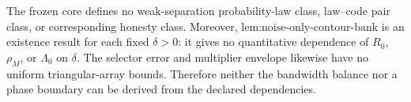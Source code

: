 The frozen core defines no weak-separation probability-law class, law--code pair class, or corresponding honesty class.  Moreover, \(\text{lem:noise-only-contour-bank}\) is an existence result for each fixed \(\delta>0\): it gives no quantitative dependence of \(R_0\), \(\rho_M\), or \(\Lambda_0\) on \(\delta\).  The selector error and multiplier envelope likewise have no uniform triangular-array bounds.  Therefore neither the bandwidth balance nor a phase boundary can be derived from the declared dependencies.